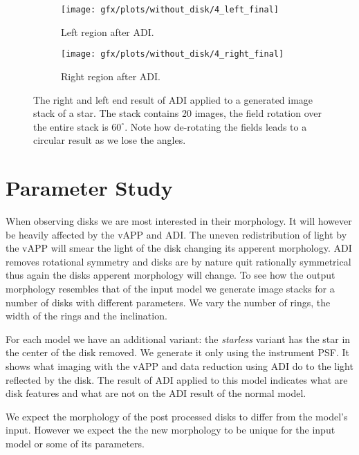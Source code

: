 \begin{figure}[h!]
      \begin{subfigure}[b]{0.5\textwidth}
        \texttt{[image: gfx/plots/without\_disk/4\_left\_final]}
        \caption{Left region after \ac{ADI}.}
      \end{subfigure}%
      \begin{subfigure}[b]{0.5\textwidth}
        \texttt{[image: gfx/plots/without\_disk/4\_right\_final]}
        \caption{Right region after \ac{ADI}.}
      \end{subfigure}      

  \caption{The right and left end result of \ac{ADI} applied to a generated image stack of a star. The stack contains 20 images, the field rotation over the entire stack is $60^{\circ}$. Note how de-rotating the fields leads to a circular result as we lose the angles.}
  \label{fig:adi_star_only}
\end{figure}

\section{Parameter Study}
\label{sec:paramstudy}
When observing disks we are most interested in their morphology. It will however be heavily affected by the \ac{vAPP} and \ac{ADI}. The uneven redistribution of light by the \ac{vAPP} will smear the light of the disk changing its apperent morphology. \ac{ADI} removes rotational symmetry and disks are by nature quit rationally symmetrical thus again the disks apperent morphology will change. To see how the output morphology resembles that of the input model we generate image stacks for a number of disks with different parameters. We vary the number of rings, the width of the rings and the inclination.

For each model we have an additional variant: the \textit{starless} variant has the star in the center of the disk removed. We generate it only using the instrument \ac{PSF}. It shows what imaging with the \ac{vAPP} and data reduction using \ac{ADI} do to the light reflected by the disk. The result of \ac{ADI} applied to this model indicates what are disk features and what are not on the \ac{ADI} result of the normal model.

We expect the morphology of the post processed disks to differ from the model's input. However we expect the the new morphology to be unique for the input model or some of its parameters.


